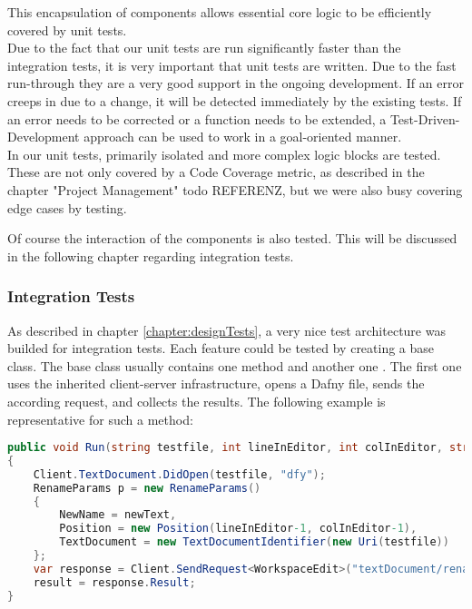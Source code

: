 This encapsulation of components allows essential core logic to be efficiently covered by unit tests. \\

Due to the fact that our unit tests are run significantly faster than the integration tests, it is very important that unit tests are written.
Due to the fast run-through they are a very good support in the ongoing development.
If an error creeps in due to a change, it will be detected immediately by the existing tests.
If an error needs to be corrected or a function needs to be extended, a Test-Driven-Development approach can be used to work in a goal-oriented manner. \\

In our unit tests, primarily isolated and more complex logic blocks are tested.
These are not only covered by a Code Coverage metric, as described in the chapter "Project Management" todo REFERENZ, but we were also busy covering edge cases by testing.

Of course the interaction of the components is also tested.
This will be discussed in the following chapter regarding integration tests.

\subsubsection{Integration Tests}
As described in chapter \ref{chapter:designTests}, a very nice test architecture was builded for integration tests.
Each feature could be tested by creating a base class.
The base class usually contains one method  and another one .
The first one uses the inherited client-server infrastructure, opens a Dafny file, sends the according request, and collects the results.
The following example is representative for such a method:

\begin{lstlisting}[language=csharp, caption={Finding a Declaration}, captionpos=b, label={lst:visitorfinddecl}]
public void Run(string testfile, int lineInEditor, int colInEditor, string newText = "newText")
{
    Client.TextDocument.DidOpen(testfile, "dfy");
    RenameParams p = new RenameParams()
    {
        NewName = newText,
        Position = new Position(lineInEditor-1, colInEditor-1),
        TextDocument = new TextDocumentIdentifier(new Uri(testfile))
    };
    var response = Client.SendRequest<WorkspaceEdit>("textDocument/rename", p, CancellationSource.Token);
    result = response.Result;
}
\end{lstlisting}

